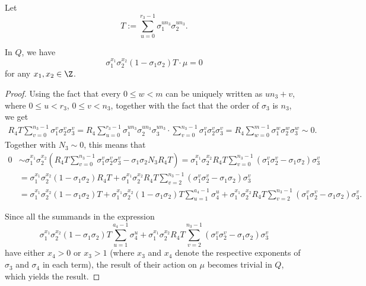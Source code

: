 Let $$T:=\sum_{u=0}^{r_3-1}\sigma_1^{un_3}\sigma_2^{un_3}.$$

\begin{lemma}\label{Tdiag4}
In $Q$, we have $$\sigma_1^{x_1}\sigma_2^{x_2}(1-\sigma_1\sigma_2)T\cdot \mu=0$$
for any $x_1,x_2\in\Z$.
\end{lemma}
\begin{proof}
Using the fact that every $0\leq w<m$ can be uniquely written as $un_3+v$, where $0\leq u<r_3$, $0\leq v<n_3$, together with the fact that the order of $\sigma_3$ is $n_3$, we get 
\begin{align*}
R_4T\sum_{v=0}^{n_3-1}\sigma_1^{v}\sigma_2^{v}\sigma_3^{v}=R_4\sum_{u=0}^{r_3-1}\sigma_1^{un_3}\sigma_2^{un_3}\sigma_3^{un_3}\cdot \sum_{v=0}^{n_3-1}\sigma_1^{v}\sigma_2^{v}\sigma_3^{v}=R_4\sum_{w=0}^{m-1}\sigma_1^{w}\sigma_2^{w}\sigma_3^{w}\sim 0.
\end{align*}
Together with $N_3\sim 0$, this means that 
\begin{align*}
0&\sim \sigma_1^{x_1}\sigma_2^{x_2}\left(R_4T \sum_{v=0}^{n_3-1}\sigma_1^{v}\sigma_2^{v}\sigma_3^{v}-\sigma_1\sigma_2N_3R_4T\right)=\sigma_1^{x_1}\sigma_2^{x_2}R_4T\sum_{v=0}^{n_3-1}\left(\sigma_1^{v}\sigma_2^{v}-\sigma_1\sigma_2\right)\sigma_3^{v}\\
&=\sigma_1^{x_1}\sigma_2^{x_2}(1-\sigma_1\sigma_2)R_4T+\sigma_1^{x_1}\sigma_2^{x_2}R_4T\sum_{v=2}^{n_3-1}\left(\sigma_1^{v}\sigma_2^{v}-\sigma_1\sigma_2\right)\sigma_3^{v}\\
&=\sigma_1^{x_1}\sigma_2^{x_2}(1-\sigma_1\sigma_2)T\!+\!
\sigma_1^{x_1}\sigma_2^{x_2}(1\!-\!\sigma_1\sigma_2)T\sum_{u=1}^{a_4-1}\sigma_4^u\!+\!\sigma_1^{x_1}\sigma_2^{x_2}R_4T\sum_{v=2}^{n_3-1}\left(\sigma_1^{v}\sigma_2^{v}\!-\!\sigma_1\sigma_2\right)\sigma_3^{v}.
\end{align*}

Since all the summands in the expression $$\sigma_1^{x_1}\sigma_2^{x_2}(1-\sigma_1\sigma_2)T\sum_{u=1}^{a_4-1}\sigma_4^u+\sigma_1^{x_1}\sigma_2^{x_2}R_4T\sum_{v=2}^{n_3-1}\left(\sigma_1^{v}\sigma_2^{v}-\sigma_1\sigma_2\right)\sigma_3^{v}$$
have either $x_4>0$ or $x_3>1$ (where $x_3$ and $x_4$ denote the respective exponents of $\sigma_3$ and $\sigma_4$ in each term), the result of their action on $\mu$ becomes trivial in $Q$, which yields the result.
\end{proof}


